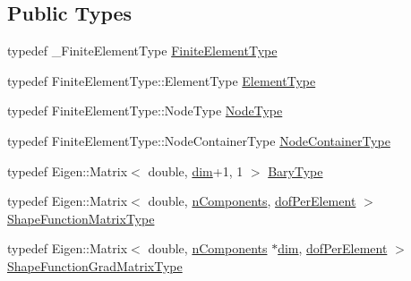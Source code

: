 \subsection*{Public Types}
\begin{DoxyCompactItemize}
\item 
typedef \+\_\+\+Finite\+Element\+Type \hyperlink{structmodel_1_1_type_traits_3_01_trial_function_3_01__n_components_00_01___finite_element_type_01_4_01_4_aadf2f168a7d028eb5c9362c701b48a90}{Finite\+Element\+Type}
\item 
typedef Finite\+Element\+Type\+::\+Element\+Type \hyperlink{structmodel_1_1_type_traits_3_01_trial_function_3_01__n_components_00_01___finite_element_type_01_4_01_4_a3f394cdc5c638178f7044046520df52b}{Element\+Type}
\item 
typedef Finite\+Element\+Type\+::\+Node\+Type \hyperlink{structmodel_1_1_type_traits_3_01_trial_function_3_01__n_components_00_01___finite_element_type_01_4_01_4_aef6826b6f376b34cee7ad2f9a964108b}{Node\+Type}
\item 
typedef Finite\+Element\+Type\+::\+Node\+Container\+Type \hyperlink{structmodel_1_1_type_traits_3_01_trial_function_3_01__n_components_00_01___finite_element_type_01_4_01_4_aec3259c82f9426309f6e9bd82cc7ed9b}{Node\+Container\+Type}
\item 
typedef Eigen\+::\+Matrix$<$ double, \hyperlink{structmodel_1_1_type_traits_3_01_trial_function_3_01__n_components_00_01___finite_element_type_01_4_01_4_a0e102b33c745ebd14f62d11dd9af9f08}{dim}+1, 1 $>$ \hyperlink{structmodel_1_1_type_traits_3_01_trial_function_3_01__n_components_00_01___finite_element_type_01_4_01_4_ab9d37a71e58765425267d776b47a8548}{Bary\+Type}
\item 
typedef Eigen\+::\+Matrix$<$ double, \hyperlink{structmodel_1_1_type_traits_3_01_trial_function_3_01__n_components_00_01___finite_element_type_01_4_01_4_a799bac386a22215dacc0f0a61172f07a}{n\+Components}, \hyperlink{structmodel_1_1_type_traits_3_01_trial_function_3_01__n_components_00_01___finite_element_type_01_4_01_4_af917eb0f3f950e58ec3dc6723ace8a3a}{dof\+Per\+Element} $>$ \hyperlink{structmodel_1_1_type_traits_3_01_trial_function_3_01__n_components_00_01___finite_element_type_01_4_01_4_afc8be749eb30a3f28ce8cca5c90d3c10}{Shape\+Function\+Matrix\+Type}
\item 
typedef Eigen\+::\+Matrix$<$ double, \hyperlink{structmodel_1_1_type_traits_3_01_trial_function_3_01__n_components_00_01___finite_element_type_01_4_01_4_a799bac386a22215dacc0f0a61172f07a}{n\+Components} $\ast$\hyperlink{structmodel_1_1_type_traits_3_01_trial_function_3_01__n_components_00_01___finite_element_type_01_4_01_4_a0e102b33c745ebd14f62d11dd9af9f08}{dim}, \hyperlink{structmodel_1_1_type_traits_3_01_trial_function_3_01__n_components_00_01___finite_element_type_01_4_01_4_af917eb0f3f950e58ec3dc6723ace8a3a}{dof\+Per\+Element} $>$ \hyperlink{structmodel_1_1_type_traits_3_01_trial_function_3_01__n_components_00_01___finite_element_type_01_4_01_4_a127adf899a7a30b0ef012a1b003a3f2d}{Shape\+Function\+Grad\+Matrix\+Type}

\end{DoxyCompactItemize}
